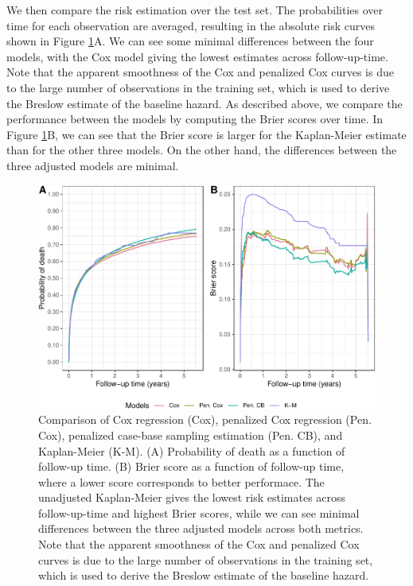 We then compare the risk estimation over the test set. The probabilities over time for each observation are averaged, resulting in the absolute risk curves shown in Figure \ref{fig:cs3FinalBrier}A. We can see some minimal differences between the four models, with the Cox model giving the lowest estimates across follow-up-time. Note that the apparent smoothness of the Cox and penalized Cox curves is due to the large number of observations in the training set, which is used to derive the Breslow estimate of the baseline hazard. As described above, we compare the performance between the models by computing the Brier scores over time. In Figure \ref{fig:cs3FinalBrier}B, we can see that the Brier score is larger for the Kaplan-Meier estimate than for the other three models. On the other hand, the differences between the three adjusted models are minimal.

\begin{figure}[ht]
\includegraphics[width=\textwidth,keepaspectratio=true]{./cs3FinalBrier-1} \caption{Comparison of Cox regression (Cox), penalized Cox regression (Pen. Cox), penalized case-base sampling estimation (Pen. CB), and Kaplan-Meier (K-M). (A)  Probability of death as a function of follow-up time. (B) Brier score as a function of follow-up time, where a lower score corresponds to better performace. The unadjusted Kaplan-Meier gives the lowest risk estimates across follow-up-time and highest Brier scores, while we can see minimal differences between the three adjusted models across both metrics. Note that the apparent smoothness of the Cox and penalized Cox curves is due to the large number of observations in the training set, which is used to derive the Breslow estimate of the baseline hazard.}\label{fig:cs3FinalBrier}
\end{figure}

